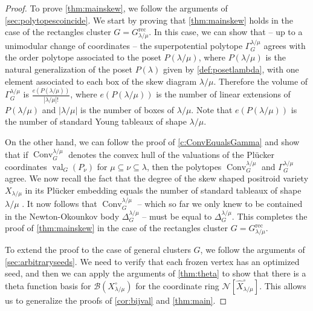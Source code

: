 \documentclass{amsart}
\theoremstyle{definition}
\numberwithin{equation}{section}
\newcommand{\conv}{\operatorname{Conv}}
\newcommand{\Q}{\Gamma}
\newcommand{\CC}{\mathcal{N}}
\newcommand{\rect}{\mathrm{rec}}
\newcommand{\val}{{\operatorname{val}}}
\begin{document}
\begin{proof}
To prove \cref{thm:mainskew}, we follow the arguments of \cref{sec:polytopescoincide}.  We start by proving that 
\cref{thm:mainskew} holds in the case of the rectangles cluster
$G = G_{\lambda/\mu}^{\rect}$.
In this case, we can show that 
-- up to a unimodular change of coordinates -- 
the superpotential polytope 
$\Gamma_G^{\lambda/\mu}$
agrees with the order polytope associated to the 
poset $P(\lambda/\mu)$, where $P(\lambda/\mu)$
is the natural generalization of the poset $P(\lambda)$
given by \cref{def:posetlambda}, with one element associated
to each box of the skew diagram $\lambda/\mu$.
Therefore the volume of 
$\Gamma_G^{\lambda/\mu}$ is 
$\frac{e(P(\lambda/\mu))}{|\lambda/\mu|!}$,
where $e(P(\lambda/\mu))$ is the number of linear extensions
of $P(\lambda/\mu)$ and $|\lambda/\mu|$ is the number of boxes
of $\lambda/\mu$.  Note that 
 $e(P(\lambda/\mu))$ is the number of standard Young tableaux
 of shape $\lambda/\mu$.

On the other hand, we can follow the proof of 
\cref{c:ConvEqualsGamma} and 
show that 
if 
$\conv_G^{\lambda/\mu}$ denotes
 the convex hull of the
valuations of the Pl\"ucker coordinates
$\val_G(P_\nu)$ for $\mu\subseteq \nu \subseteq \lambda$, then
the polytopes 
$\conv_G^{\lambda/\mu}$ 
and $\Q^{\lambda/\mu}_{G}$ agree.
We now recall the fact that 
the degree of the skew shaped positroid variety
$X_{\lambda/\mu}$ in its Pl\"ucker 
embedding equals the number of standard tableaux
	of shape $\lambda/\mu$ \cite[Section 4]{StanleySchubert}.
It now follows that 
$\conv_G^{\lambda/\mu}$  -- which so far
we only knew to be contained in the 
 Newton-Okounkov body $\Delta_G^{\lambda/\mu}$  -- 
must be equal to 
  $\Delta_G^{\lambda/\mu}$. 
This completes the proof of 
\cref{thm:mainskew} in the case of the rectangles cluster
$G = G_{\lambda/\mu}^{\rect}$.

To extend the proof to the case of general clusters $G$,
we follow the arguments of \cref{sec:arbitraryseeds}.
We need to verify that each frozen vertex has an optimized 
seed, and then we can apply the arguments of 
\cref{thm:theta} to show that 
there is a theta function basis for 
 $\mathcal{B}(X_{\lambda/\mu}^{\circ})$ for the coordinate ring
$\CC[\widehat{X}_{\lambda/\mu}^{\circ}]$.
This allows us to generalize the proofs of 
	\cref{cor:bijval} and \cref{thm:main}.
\end{proof}




\appendix
\end{document}
